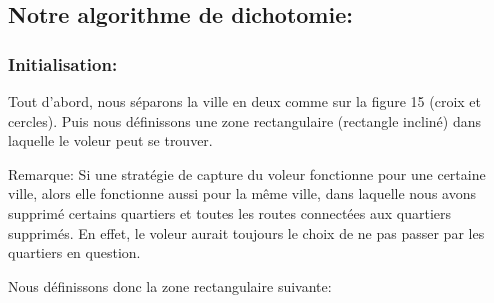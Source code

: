 \subsection{Notre algorithme de dichotomie:}
\subsubsection{Initialisation:}
Tout d'abord, nous séparons la ville en deux comme sur la figure 15 (croix et cercles). Puis nous définissons une zone rectangulaire (rectangle incliné) dans laquelle le voleur peut se trouver.

\medskip

Remarque: Si une stratégie de capture du voleur fonctionne pour une certaine ville, alors elle fonctionne aussi pour la même ville, dans laquelle nous avons supprimé certains quartiers et toutes les routes connectées aux quartiers supprimés. En effet, le voleur aurait toujours le choix de ne pas passer par les quartiers en question.

\medskip

Nous définissons donc la zone rectangulaire suivante:

